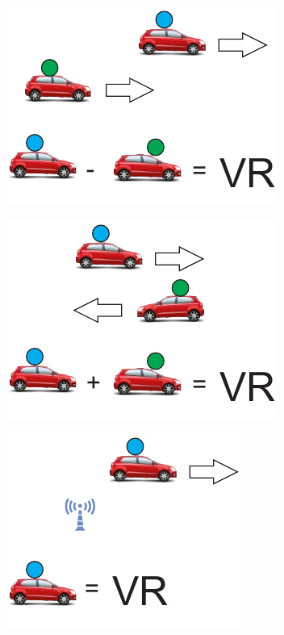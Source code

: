 \begin{figure}[htbp]
	\centering
	\begin{minipage}{0.46\textwidth}
		\centering
		\includegraphics[scale=0.5]{resultados/figuras/velocidadeRelativaNegativa.pdf}
		\label{fig:velocidadeRelativaNegativa}
	\end{minipage}
	\begin{minipage}{0.46\textwidth}
		\centering
		\includegraphics[scale=0.5]{resultados/figuras/velocidadeRelativaPositiva.pdf}
		\label{fig:velocidadeRelativaPositiva}
	\end{minipage}
	\begin{minipage}{0.46\textwidth}
		\centering
		\includegraphics[scale=0.5]{resultados/figuras/velocidadeRelativaNeutra.pdf}
		\label{fig:velocidadeRelativaNeutra}
	\end{minipage}
\end{figure} 